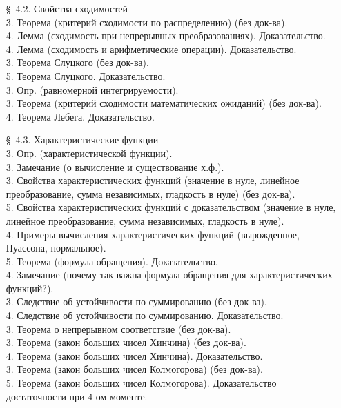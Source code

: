 \documentclass[10pt]{amsart}
\begin{document}
\begin{enumerate}
\begin{enumerate}
        
        
\item[\S\, 4.2.] Свойства сходимостей \\
        
3. Теорема (критерий сходимости по распределению) (без док-ва). \\
4. Лемма  (сходимость при непрерывных преобразованиях). Доказательство. \\
4. Лемма (сходимость и арифметические операции). Доказательство. \\
3. Теорема Слуцкого (без док-ва). \\
5. Теорема Слуцкого. Доказательство. \\
3. Опр. (равномерной интегрируемости). \\
3. Теорема (критерий сходимости математических ожиданий) (без док-ва). \\
4. Теорема Лебега. Доказательство. \\

         
    
\item[\S\, 4.3.] Характеристические функции \\
3. Опр. (характеристической функции). \\
3. Замечание (о вычисление и существование х.ф.). \\
3. Свойства характеристических функций (значение в нуле, линейное преобразование, сумма независимых, гладкость в нуле) (без док-ва). \\
5. Свойства характеристических функций с доказательством (значение в нуле, линейное преобразование, сумма независимых, гладкость в нуле). \\
4. Примеры вычисления характеристических функций (вырожденное, Пуассона, нормальное). \\
5. Теорема (формула обращения). Доказательство. \\
4. Замечание (почему так важна формула обращения для характеристических функций?). \\
3. Следствие об устойчивости по суммированию (без док-ва). \\
4. Следствие об устойчивости по суммированию. Доказательство. \\
3. Теорема о непрерывном соответствие (без док-ва). \\
3. Теорема (закон больших чисел Хинчина) (без док-ва). \\
4. Теорема (закон больших чисел Хинчина).  Доказательство. \\
3. Теорема (закон больших чисел Колмогорова) (без док-ва). \\
5. Теорема (закон больших чисел Колмогорова). Доказательство достаточности при 4-ом моменте. \\


\end{enumerate}
\end{enumerate}
\end{document}
